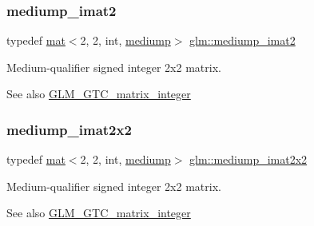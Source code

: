 \subsubsection{\texorpdfstring{mediump\+\_\+imat2}{mediump\_imat2}}
{\footnotesize\ttfamily typedef \mbox{\hyperlink{structglm_1_1mat}{mat}}$<$2, 2, int, \mbox{\hyperlink{namespaceglm_a36ed105b07c7746804d7fdc7cc90ff25a6416f3ea0c9025fb21ed50c4d6620482}{mediump}}$>$ \mbox{\hyperlink{group__gtc__matrix__integer_ga74e065ab9524e6b7bd5a84cffb758e71}{glm\+::mediump\+\_\+imat2}}}

Medium-\/qualifier signed integer 2x2 matrix. \begin{DoxySeeAlso}{See also}
\mbox{\hyperlink{group__gtc__matrix__integer}{G\+L\+M\+\_\+\+G\+T\+C\+\_\+matrix\+\_\+integer}} 
\end{DoxySeeAlso}
\mbox{\label{group__gtc__matrix__integer_gafe326375aa42c0abbe571d376f4cbd95}} 
\subsubsection{\texorpdfstring{mediump\+\_\+imat2x2}{mediump\_imat2x2}}
{\footnotesize\ttfamily typedef \mbox{\hyperlink{structglm_1_1mat}{mat}}$<$2, 2, int, \mbox{\hyperlink{namespaceglm_a36ed105b07c7746804d7fdc7cc90ff25a6416f3ea0c9025fb21ed50c4d6620482}{mediump}}$>$ \mbox{\hyperlink{group__gtc__matrix__integer_gafe326375aa42c0abbe571d376f4cbd95}{glm\+::mediump\+\_\+imat2x2}}}

Medium-\/qualifier signed integer 2x2 matrix. \begin{DoxySeeAlso}{See also}
\mbox{\hyperlink{group__gtc__matrix__integer}{G\+L\+M\+\_\+\+G\+T\+C\+\_\+matrix\+\_\+integer}} 
\end{DoxySeeAlso}
\mbox{\label{group__gtc__matrix__integer_ga1e2d944bde5dfe9fe49824c4c3457e30}} 
